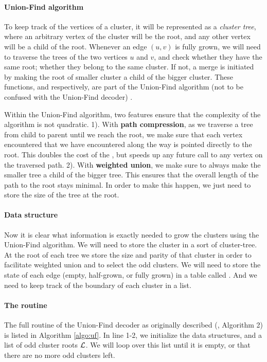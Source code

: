 \paragraph{Union-Find algorithm}
To keep track of the vertices of a cluster, it will be represented as a \emph{cluster tree}, where an arbitrary vertex of the cluster will be the root, and any other vertex will be a child of the root. Whenever an edge $(u,v)$ is fully grown, we will need to traverse the trees of the two vertices $u$ and $v$, and check whether they have the same root; whether they belong to the same cluster. If not, a merge is initiated by making the root of smaller cluster a child of the bigger cluster. These functions,  and  respectively, are part of the Union-Find algorithm (not to be confused with the Union-Find decoder) \cite{tarjan1975efficiency}.

Within the Union-Find algorithm, two features ensure that the complexity of the algorithm is not quadratic. 1). With \textbf{path compression}, as we traverse a tree from child to parent until we reach the root, we make sure that each vertex encountered that we have encountered along the way is pointed directly to the root. This doubles the cost of the , but speeds up any future call to any vertex on the traversed path. 2). With \textbf{weighted union}, we make sure to always make the smaller tree a child of the bigger tree. This ensures that the overall length of the path to the root stays minimal. In order to make this happen, we just need to store the size of the tree at the root.

\paragraph{Data structure}
Now it is clear what information is exactly needed to grow the clusters using the Union-Find algorithm. We will need to store the cluster in a sort of cluster-tree. At the root of each tree we store the size and parity of that cluster in order to facilitate weighted union and to select the odd clusters. We will need to store the state of each edge (empty, half-grown, or fully grown) in a table called . And we need to keep track of the boundary of each cluster in a  list.

\paragraph{The routine}
The full routine of the Union-Find decoder as originally described (\cite{delfosse2017almost}, Algorithm 2) is listed in Algorithm \ref{algo:uf}. In line 1-2, we initialize the data structures, and a list of odd cluster roots $\mathcal{L}$. We will loop over this list until it is empty, or that there are no more odd clusters left.

